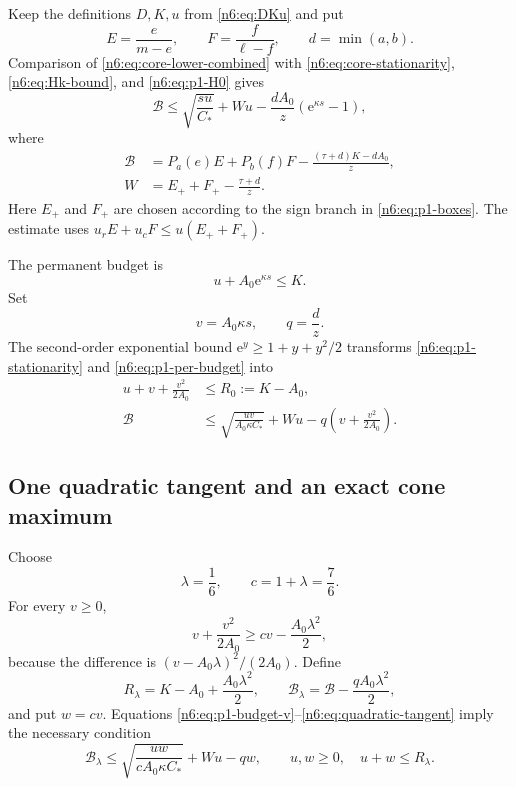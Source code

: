 \documentclass[11pt]{article}
\numberwithin{equation}{section}
\theoremstyle{definition}
\newcommand{\e}{\mathrm e}
\begin{document}
Keep the definitions $D,K,u$ from \eqref{n6:eq:DKu} and put
\[
 E=\frac e{m-e},
 \qquad
 F=\frac f{\ell-f},
 \qquad
 d=\min(a,b).
\]
Comparison of \eqref{n6:eq:core-lower-combined} with
\eqref{n6:eq:core-stationarity}, \eqref{n6:eq:Hk-bound}, and
\eqref{n6:eq:p1-H0} gives
\begin{equation}
 \mathcal B
 \le
 \sqrt{\frac{su}{C_*}}
 +Wu
 -\frac{dA_0}{z}(\e^{\kappa s}-1),\label{n6:eq:p1-stationarity}
\end{equation}
where
\begin{align}
 \mathcal B
 &=P_a(e)E+P_b(f)F
 -\frac{(\tau+d)K-dA_0}{z},\label{n6:eq:p1-B}\\
 W&=E_++F_+-\frac{\tau+d}{z}.\label{n6:eq:p1-W}
\end{align}
Here $E_+$ and $F_+$ are chosen according to the sign branch in
\eqref{n6:eq:p1-boxes}.  The estimate uses
$u_rE+u_cF\le u(E_++F_+)$.

The permanent budget is
\begin{equation}
 u+A_0\e^{\kappa s}\le K.\label{n6:eq:p1-per-budget}
\end{equation}
Set
\begin{equation}
 v=A_0\kappa s,
 \qquad
 q=\frac dz.\label{n6:eq:vq}
\end{equation}
The second-order exponential bound
$\e^y\ge1+y+y^2/2$ transforms
\eqref{n6:eq:p1-stationarity} and \eqref{n6:eq:p1-per-budget} into
\begin{align}
 u+v+\frac{v^2}{2A_0}&\le R_0:=K-A_0,\label{n6:eq:p1-budget-v}\\
 \mathcal B&\le
 \sqrt{\frac{uv}{A_0\kappa C_*}}
 +Wu-q\left(v+\frac{v^2}{2A_0}\right).\label{n6:eq:p1-stationarity-v}
\end{align}

\subsection{One quadratic tangent and an exact cone maximum}

Choose
\begin{equation}
 \lambda=\frac16,
 \qquad c=1+\lambda=\frac76.\label{n6:eq:tangent-lambda}
\end{equation}
For every $v\ge0$,
\begin{equation}
 v+\frac{v^2}{2A_0}
 \ge cv-\frac{A_0\lambda^2}{2},\label{n6:eq:quadratic-tangent}
\end{equation}
because the difference is $(v-A_0\lambda)^2/(2A_0)$.  Define
\begin{equation}
 R_\lambda=K-A_0+\frac{A_0\lambda^2}{2},
 \qquad
 \mathcal B_\lambda
 =\mathcal B-\frac{qA_0\lambda^2}{2},\label{n6:eq:Rlambda-Blambda}
\end{equation}
and put $w=cv$.  Equations
\eqref{n6:eq:p1-budget-v}--\eqref{n6:eq:quadratic-tangent} imply the necessary
condition
\begin{equation}
 \mathcal B_\lambda
 \le
 \sqrt{\frac{uw}{cA_0\kappa C_*}}+Wu-qw,
 \qquad
 u,w\ge0,
 \quad u+w\le R_\lambda.\label{n6:eq:triangle-problem}
\end{equation}
\end{document}
